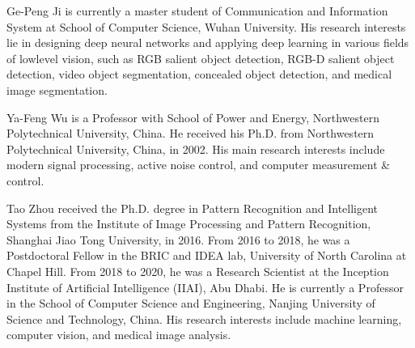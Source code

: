 \documentclass[lettersize,journal]{IEEEtran}
\begin{document}
 \begin{IEEEbiography}{Ge-Peng Ji}
	is currently a master student of Communication
	and Information System at School of Computer
	Science, Wuhan University. His research interests lie in designing deep neural networks and applying deep learning in various fields of lowlevel vision, such as RGB salient object detection, RGB-D salient object detection, video object segmentation, concealed object detection, and medical image segmentation.
\end{IEEEbiography}
 \begin{IEEEbiography}{Ya-Feng Wu}
	is a Professor with School of Power and Energy, Northwestern Polytechnical University, China. He received his Ph.D. from Northwestern Polytechnical University, China, in 2002.
	His main research interests include modern signal processing, active noise control, and computer measurement \& control.
\end{IEEEbiography}

 \begin{IEEEbiography}{Tao Zhou}
	received the Ph.D. degree in Pattern Recognition and Intelligent Systems from the Institute of Image Processing and Pattern Recognition, Shanghai Jiao Tong University, in 2016. From 2016 to 2018, he was a Postdoctoral Fellow in the BRIC and IDEA lab, University of North Carolina at Chapel Hill. From 2018 to 2020, he was a Research Scientist at the Inception Institute of Artificial Intelligence (IIAI), Abu Dhabi. He is currently a Professor in the School of Computer Science and Engineering, Nanjing University of Science and Technology, China. His research interests include machine learning, computer vision, and medical image analysis.
\end{IEEEbiography}


\end{document}
